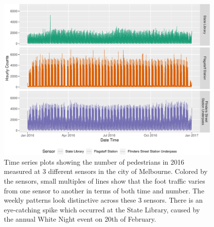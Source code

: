 \begin{Schunk}
\begin{figure}

{\centering \includegraphics[width=\textwidth]{figure/time-series-plot-1} 

}

\caption[Time series plots showing the number of pedestrians in 2016 measured at 3 different sensors in the city of Melbourne]{Time series plots showing the number of pedestrians in 2016 measured at 3 different sensors in the city of Melbourne. Colored by the sensors, small multiples of lines show that the foot traffic varies from one sensor to another in terms of both time and number. The weekly patterns look distinctive across these 3 sensors. There is an eye-catching spike which occurred at the State Library, caused by the annual White Night event on 20th of February.}\label{fig:time-series-plot}
\end{figure}
\end{Schunk}

